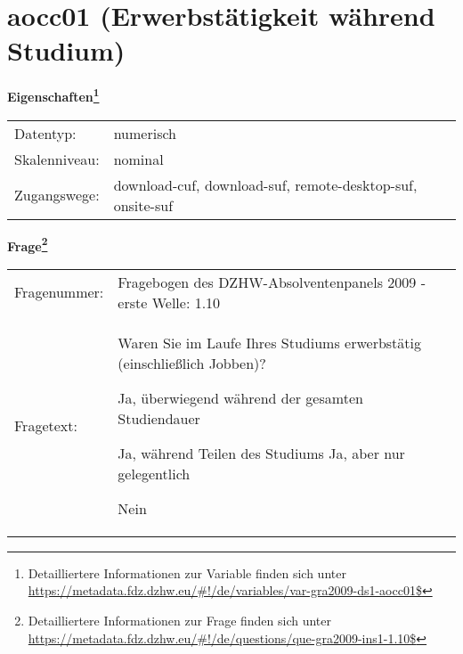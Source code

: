 
    \setcounter{footnote}{0}

    \vspace*{-1.8cm}
	\section{aocc01 (Erwerbstätigkeit während Studium)}
	\label{section:aocc01}



    \vspace*{0.5cm}
    \noindent\textbf{Eigenschaften\footnote{Detailliertere Informationen zur Variable finden sich unter
		\url{https://metadata.fdz.dzhw.eu/\#!/de/variables/var-gra2009-ds1-aocc01$}}}\\
	\begin{tabularx}{\hsize}{@{}lX}
	Datentyp: & numerisch \\
	Skalenniveau: & nominal \\
	Zugangswege: &
	  download-cuf, 
	  download-suf, 
	  remote-desktop-suf, 
	  onsite-suf
 \\
    \end{tabularx}



				\vspace*{0.5cm}
                \noindent\textbf{Frage\footnote{Detailliertere Informationen zur Frage finden sich unter
		              \url{https://metadata.fdz.dzhw.eu/\#!/de/questions/que-gra2009-ins1-1.10$}}}\\
				\begin{tabularx}{\hsize}{@{}lX}
					Fragenummer: &
					  Fragebogen des DZHW-Absolventenpanels 2009 - erste Welle:
					  1.10
 \\
					Fragetext: & Waren Sie im Laufe Ihres Studiums erwerbstätig (einschließlich Jobben)?\par  Ja, überwiegend während der gesamten Studiendauer\par  Ja, während Teilen des Studiums Ja, aber nur gelegentlich\par  Nein \\
				\end{tabularx}





